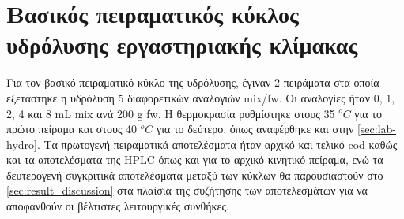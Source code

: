 \documentclass[11pt]{report}
\begin{document}
\section{Βασικός πειραματικός κύκλος υδρόλυσης εργαστηριακής κλίμακας}
\label{sec:org85cd045}
Για τον βασικό πειραματικό κύκλο της υδρόλυσης, έγιναν 2 πειράματα στα οποία εξετάστηκε η υδρόλυση 5 διαφορετικών αναλογιών \acrshort{mix}/\acrshort{fw}. Οι αναλογίες ήταν 0, 1, 2, 4 και 8 mL \acrshort{mix} ανά 200 g \acrshort{fw}. Η θερμοκρασία ρυθμίστηκε στους 35 \(^oC\) για το πρώτο πείραμα και στους 40 \(^oC\) για το δεύτερο, όπως αναφέρθηκε και στην \autoref{sec:lab-hydro}. Τα πρωτογενή πειραματικά αποτελέσματα ήταν αρχικό και τελικό \acrshort{cod} καθώς και τα αποτελέσματα της HPLC όπως και για το αρχικό κινητικό πείραμα, ενώ τα δευτερογενή συγκριτικά αποτελέσματα μεταξύ των κύκλων θα παρουσιαστούν στο \autoref{sec:result_discussion} στα πλαίσια της συζήτησης των αποτελεσμάτων για να αποφανθούν οι βέλτιστες λειτουργικές συνθήκες.
\end{document}
